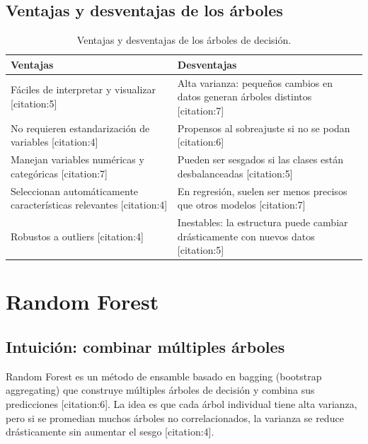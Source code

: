\documentclass[12pt,a4paper,openany,oneside]{book}
\begin{document}
\subsection{Ventajas y desventajas de los árboles}
\begin{table}[h]
\centering
\begin{tabular}{|p{5cm}|p{5cm}|}
\hline
\textbf{Ventajas} & \textbf{Desventajas} \\
\hline
Fáciles de interpretar y visualizar [citation:5] & Alta varianza: pequeños cambios en datos generan árboles distintos [citation:7] \\
No requieren estandarización de variables [citation:4] & Propensos al sobreajuste si no se podan [citation:6] \\
Manejan variables numéricas y categóricas [citation:7] & Pueden ser sesgados si las clases están desbalanceadas [citation:5] \\
Seleccionan automáticamente características relevantes [citation:4] & En regresión, suelen ser menos precisos que otros modelos [citation:7] \\
Robustos a outliers [citation:4] & Inestables: la estructura puede cambiar drásticamente con nuevos datos [citation:5] \\
\hline
\end{tabular}
\caption{Ventajas y desventajas de los árboles de decisión.}
\end{table}

\section{Random Forest}

\subsection{Intuición: combinar múltiples árboles}
Random Forest es un método de ensamble basado en bagging (bootstrap aggregating) que construye múltiples árboles de decisión y combina sus predicciones [citation:6]. La idea es que cada árbol individual tiene alta varianza, pero si se promedian muchos árboles no correlacionados, la varianza se reduce drásticamente sin aumentar el sesgo [citation:4].
\end{document}
